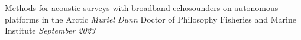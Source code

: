 \documentclass[letterpaper,12pt]{report}
\begin{document}

\thesistitle
	{Methods for acoustic surveys with broadband echosounders on autonomous platforms in the Arctic}
	{\emph{Muriel Dunn} }
	{Doctor of Philosophy}
	{Fisheries and Marine Institute}
	{\emph{September 2023}}















%




\appendix




\end{document}
